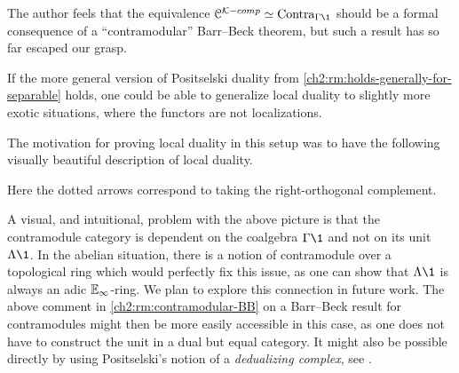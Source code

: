\begin{remark}
    \label{ch2:rm:contramodular-BB}
    The author feels that the equivalence $\C^{\K-comp}\simeq \Contra_{\Gamma\1}$ should be a formal consequence of a ``contramodular'' Barr--Beck theorem, but such a result has so far escaped our grasp. 
\end{remark}

\begin{remark}
    If the more general version of Positselski duality from \cref{ch2:rm:holds-generally-for-separable} holds, one could be able to generalize local duality to slightly more exotic situations, where the functors are not localizations. 
\end{remark}

The motivation for proving local duality in this setup was to have the following visually beautiful description of local duality. 

\begin{center}
\end{center}

Here the dotted arrows correspond to taking the right-orthogonal complement. 

\begin{remark}
    \label{ch2:rm:contramodule-over-pro-ring}
    A visual, and intuitional, problem with the above picture is that the contramodule category is dependent on the coalgebra $\Gamma\1$ and not on its unit $\Lambda \1$. In the abelian situation, there is a notion of contramodule over a topological ring which would perfectly fix this issue, as one can show that $\Lambda \1$ is always an adic $\mathbb{E}_\infty$-ring. We plan to explore this connection in future work. The above comment in \cref{ch2:rm:contramodular-BB} on a Barr--Beck result for contramodules might then be more easily accessible in this case, as one does not have to construct the unit in a dual but equal category. It might also be possible directly by using Positselski's notion of a \emph{dedualizing complex}, see \cite{positselski_2016}. 
\end{remark}

